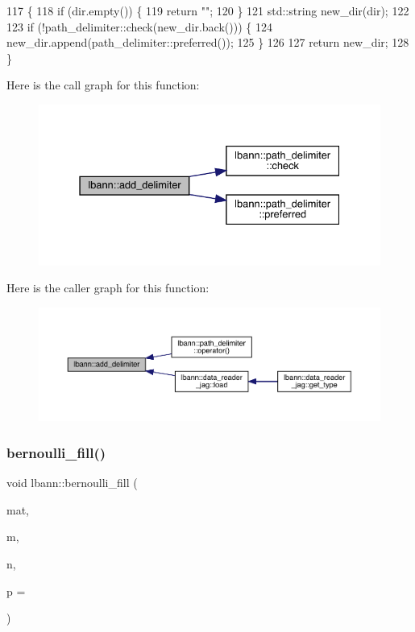 \begin{DoxyCode}
117                                              \{
118   \textcolor{keywordflow}{if} (dir.empty()) \{
119     \textcolor{keywordflow}{return} \textcolor{stringliteral}{""};
120   \}
121   std::string new\_dir(dir);
122 
123   \textcolor{keywordflow}{if} (!path\_delimiter::check(new\_dir.back())) \{
124     new\_dir.append(path\_delimiter::preferred());
125   \}
126 
127   \textcolor{keywordflow}{return} new\_dir;
128 \}
\end{DoxyCode}
Here is the call graph for this function\+:\nopagebreak
\begin{figure}[H]
\begin{center}
\leavevmode
\includegraphics[width=331pt]{namespacelbann_a1b8b05bbf2e59808a51ead80c47a9359_cgraph}
\end{center}
\end{figure}
Here is the caller graph for this function\+:\nopagebreak
\begin{figure}[H]
\begin{center}
\leavevmode
\includegraphics[width=350pt]{namespacelbann_a1b8b05bbf2e59808a51ead80c47a9359_icgraph}
\end{center}
\end{figure}
\mbox{\label{namespacelbann_ae8bc674a3d676391666524b44cbc4068}} 
\subsubsection{\texorpdfstring{bernoulli\+\_\+fill()}{bernoulli\_fill()}}
{\footnotesize\ttfamily void lbann\+::bernoulli\+\_\+fill (\begin{DoxyParamCaption}\item[{\hyperlink{base_8hpp_a9a697a504ae84010e7439ffec862b470}{Abs\+Dist\+Mat} \&}]{mat,  }\item[{El\+::\+Int}]{m,  }\item[{El\+::\+Int}]{n,  }\item[{double}]{p = {} }\end{DoxyParamCaption})}

